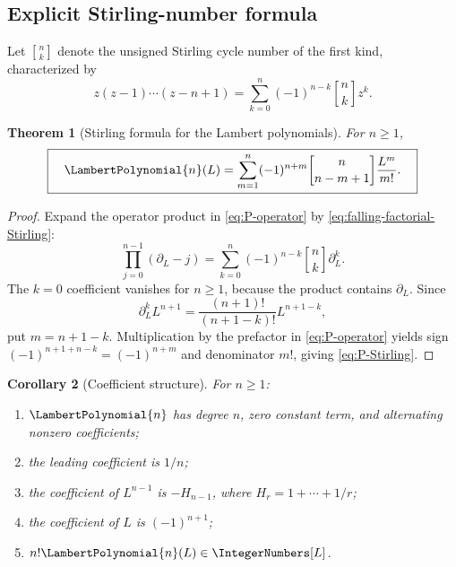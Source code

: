 \documentclass[11pt]{article}
\theoremstyle{pltheorem}
\newtheorem{theorem}{Theorem}[section]
\newtheorem{corollary}[theorem]{Corollary}
\newcommand{\stirlingone}[2]{\genfrac{[}{]}{0pt}{}{#1}{#2}}
\begin{document}
\subsection{Explicit Stirling-number formula}

Let \(\stirlingone{n}{k}\) denote the unsigned Stirling cycle number of the first kind, characterized by
\begin{equation}\label{eq:falling-factorial-Stirling}
 z(z-1)\cdots(z-n+1)
 =\sum_{k=0}^{n}(-1)^{n-k}\stirlingone{n}{k}z^k.
\end{equation}

\begin{theorem}[Stirling formula for the Lambert polynomials]\label{thm:P-Stirling}
For \(n\ge1\),
\begin{equation}\label{eq:P-Stirling}
 \boxed{\quad
 \LambertPolynomial{n}(L)=\sum_{m=1}^{n}(-1)^{n+m}
 \stirlingone{n}{n-m+1}\frac{L^m}{m!}.
 \quad}
\end{equation}
\end{theorem}

\begin{proof}
Expand the operator product in \cref{eq:P-operator} by
\cref{eq:falling-factorial-Stirling}:
\[
 \prod_{j=0}^{n-1}(\partial_L-j)
 =\sum_{k=0}^{n}(-1)^{n-k}\stirlingone{n}{k}\partial_L^k.
\]
The \(k=0\) coefficient vanishes for \(n\ge1\), because the product contains \(\partial_L\).  Since
\[
 \partial_L^kL^{n+1}=\frac{(n+1)!}{(n+1-k)!}L^{n+1-k},
\]
put \(m=n+1-k\).  Multiplication by the prefactor in
\cref{eq:P-operator} yields sign
\((-1)^{n+1+n-k}=(-1)^{n+m}\) and denominator \(m!\), giving
\cref{eq:P-Stirling}.
\end{proof}

\begin{corollary}[Coefficient structure]\label{cor:P-coeff-structure}
For \(n\ge1\):
\begin{enumerate}[label=\textup{(\roman*)}]
\item \(\LambertPolynomial{n}\) has degree \(n\), zero constant term, and alternating nonzero coefficients;
\item the leading coefficient is \(1/n\);
\item the coefficient of \(L^{n-1}\) is \(-H_{n-1}\), where
\(H_r=1+\cdots+1/r\);
\item the coefficient of \(L\) is \((-1)^{n+1}\);
\item \(n!\LambertPolynomial{n}(L)\in\IntegerNumbers[L]\).
\end{enumerate}
\end{corollary}
\end{document}

